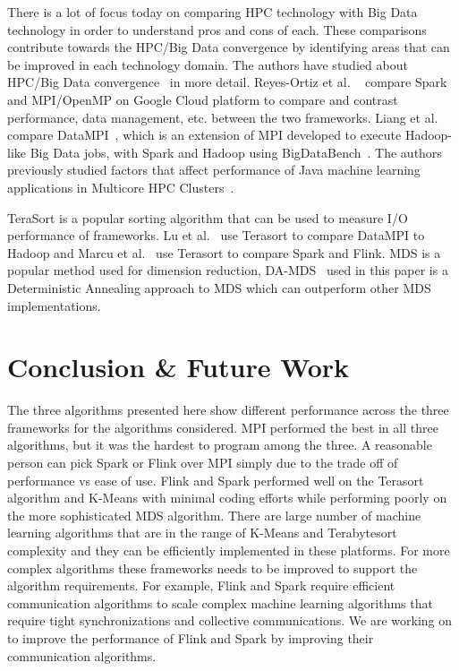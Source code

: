 \documentclass[conference]{IEEEtran}
\begin{document}
There is a lot of focus today on comparing HPC technology with Big Data technology in order to understand pros and cons of each. These comparisons contribute towards the HPC/Big Data convergence by identifying areas that can be improved in each technology domain. The authors have studied about HPC/Big Data convergence~\cite{fox1858big} in more detail. Reyes-Ortiz et al. ~\cite{reyes2015big} compare Spark and MPI/OpenMP on Google Cloud platform to compare and contrast performance, data management, etc. between the two frameworks. Liang et al. ~\cite{liang2014performance} compare DataMPI~\cite{lu2014datampi}, which is an extension of MPI developed to execute Hadoop-like Big Data jobs, with Spark and Hadoop using BigDataBench~\cite{wang2014bigdatabench}. The authors previously studied factors that affect performance of Java machine learning applications in Multicore HPC Clusters~\cite{ekanayakejava}.

TeraSort is a popular sorting algorithm that can be used to measure I/O performance of frameworks. Lu et al.~\cite{lu2014datampi} use Terasort to compare DataMPI to Hadoop and Marcu et al.~\cite{marcu2016spark} use Terasort to compare Spark and Flink. MDS is a popular method used for dimension reduction, DA-MDS~\cite{bae2010multidimensional} used in this paper is a Deterministic Annealing approach to MDS which can outperform other MDS implementations. 

\section{Conclusion \& Future Work} \label{conclusion}
The three algorithms presented here show different performance across the three frameworks for the algorithms considered. MPI performed the best in all three algorithms, but it was the hardest to program among the three. A reasonable person can pick Spark or Flink over MPI simply due to the trade off of performance vs ease of use. Flink and Spark performed well on the Terasort algorithm and K-Means with minimal coding efforts while performing poorly on the more sophisticated MDS algorithm. There are large number of machine learning algorithms that are in the range of K-Means and Terabytesort complexity and they can be efficiently implemented in these platforms. For more complex algorithms these frameworks needs to be improved to support the algorithm requirements. For example, Flink and Spark require efficient communication algorithms to scale complex machine learning algorithms that require tight synchronizations and collective communications. We are working on to improve the performance of Flink and Spark by improving their communication algorithms. 
\end{document}
